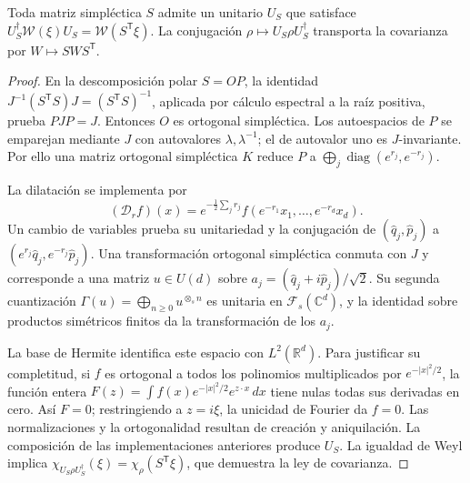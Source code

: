 \begin{lemma}
\label{md:antmem:gauss:lem:implementacion-simplectica}
Toda matriz simpléctica \(S\) admite un unitario \(U_S\) que satisface
\(U_S^\dagger\mathcal W(\xi)U_S=\mathcal W(S^{\mathsf T}\xi)\).
La conjugación \(\rho\mapsto U_S\rho U_S^\dagger\) transporta
la covarianza por \(W\mapsto SWS^{\mathsf T}\).
\end{lemma}
\begin{proof}
En la descomposición polar \(S=OP\), la identidad
\(J^{-1}(S^{\mathsf T}S)J=(S^{\mathsf T}S)^{-1}\), aplicada por
cálculo espectral a la raíz positiva, prueba \(PJP=J\).
Entonces \(O\) es ortogonal simpléctica. Los autoespacios de \(P\)
se emparejan mediante \(J\) con autovalores \(\lambda,\lambda^{-1}\);
el de autovalor uno es \(J\)-invariante. Por ello una matriz
ortogonal simpléctica \(K\) reduce \(P\) a
\(\bigoplus_j\operatorname{diag}(e^{r_j},e^{-r_j})\).

La dilatación se implementa por
\[
 (\mathcal D_rf)(x)=e^{-\frac12\sum_jr_j}
 f(e^{-r_1}x_1,\ldots,e^{-r_d}x_d).
\]
Un cambio de variables prueba su unitariedad y la conjugación de
\((\widehat q_j,\widehat p_j)\) a
\((e^{r_j}\widehat q_j,e^{-r_j}\widehat p_j)\).
Una transformación ortogonal simpléctica conmuta con \(J\) y
corresponde a una matriz \(u\in U(d)\) sobre
\(a_j=(\widehat q_j+i\widehat p_j)/\sqrt2\). Su segunda
cuantización \(\Gamma(u)=\bigoplus_{n\geq0}u^{\otimes_s n}\)
es unitaria en \(\mathcal F_s(\mathbb C^d)\), y la identidad sobre
productos simétricos finitos da la transformación de los \(a_j\).

La base de Hermite identifica este espacio con \(L^2(\mathbb R^d)\).
Para justificar su completitud, si \(f\) es ortogonal a todos los
polinomios multiplicados por \(e^{-|x|^2/2}\), la función entera
\(F(z)=\int f(x)e^{-|x|^2/2}e^{z\cdot x}\,dx\) tiene nulas
todas sus derivadas en cero. Así \(F=0\); restringiendo a
\(z=i\xi\), la unicidad de Fourier da \(f=0\). Las
normalizaciones y la ortogonalidad resultan de creación y aniquilación.
La composición de las implementaciones anteriores produce \(U_S\).
La igualdad de Weyl implica
\(\chi_{U_S\rho U_S^\dagger}(\xi)=\chi_\rho(S^{\mathsf T}\xi)\),
que demuestra la ley de covarianza.
\end{proof}

